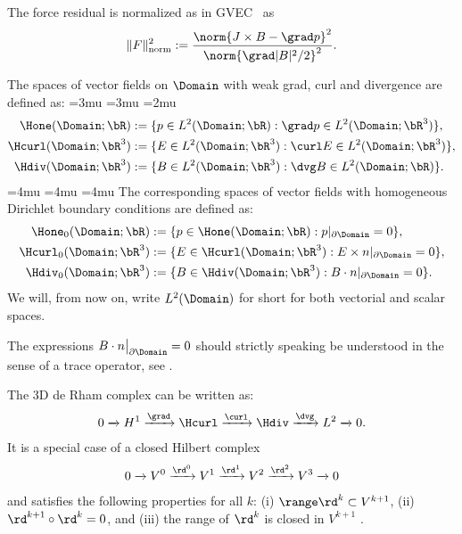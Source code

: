 \documentclass[%
 reprint,
 superscriptaddress,
 amsmath,amssymb,
 aps, nofootinbib, floatfix]{revtex4-2}
\begin{document}
The force residual is normalized as in GVEC~\cite{Hindenlang2026} as
\begin{align}
    \| F \|^2_{\mathrm{norm}} := \frac{\norm{J \times B - \grad p}^2}{\norm{ \grad |B|^2 / 2}^2}.
\end{align}

\begin{definition}
    The spaces of vector fields on $\Domain$ with weak grad, curl and divergence are defined as:
    \medmuskip=3mu
    \thinmuskip=3mu
    \thickmuskip=2mu
    \begin{align}
        \Hone(\Domain; \bR)    &:= \{ p \in L^2(\Domain; \bR): \grad p \in L^2(\Domain; \bR^3) \},  \\
        \Hcurl(\Domain; \bR^3) &:= \{ E \in L^2(\Domain; \bR^3): \curl E \in L^2(\Domain; \bR^3) \}, \\
        \Hdiv(\Domain; \bR^3)  &:= \{ B \in L^2(\Domain; \bR^3): \dvg B \in L^2(\Domain; \bR) \}.
    \end{align}
    \medmuskip=4mu
    \thinmuskip=4mu
    \thickmuskip=4mu
    The corresponding spaces of vector fields with homogeneous Dirichlet boundary conditions are defined as:
    \begin{align}
        \Hone_0(\Domain; \bR)    &:= \{ p \in \Hone(\Domain; \bR): p|_{\partial \Domain} = 0 \},  \\
        \Hcurl_0(\Domain; \bR^3) &:= \{ E \in \Hcurl(\Domain; \bR^3): E \times n|_{\partial \Domain} = 0 \},  \\
        \Hdiv_0(\Domain; \bR^3)  &:= \{ B \in \Hdiv(\Domain; \bR^3): B \cdot n|_{\partial \Domain} = 0 \}.
    \end{align}
    We will, from now on, write $L^2(\Domain)$ for short for both vectorial and scalar spaces.
\end{definition}
\begin{remark}
    The expressions $B \cdot n \big |_{\partial \Domain} = 0$ should strictly speaking be understood in the sense of a trace operator, see \citep[Lemma 2.1.1]{boffi_mixed_2013}.
\end{remark}
%
The 3D de Rham complex can be written as:
\begin{align}
    \label{eq:deRhamComplex}
    0 \xrightarrow[]{} H^1 \xrightarrow[]{\grad} \Hcurl \xrightarrow[]{\curl}\Hdiv \xrightarrow[]{\dvg} L^2 \xrightarrow[]{} 0. 
\end{align}
It is a special case of a closed Hilbert complex
\begin{align}
    \label{eq:deRhamComplex_general}
    0 \xrightarrow[]{} V^0 \xrightarrow[]{\rd^0} V^1 \xrightarrow[]{\rd^1} V^2 \xrightarrow[]{\rd^2} V^3 \xrightarrow[]{} 0
\end{align}
and satisfies the following properties for all $k$: (i) $\range \rd^k \subset V^{k+1}$, (ii) $\rd^{k+1} \circ \rd^{k} = 0$, and (iii) the range of $\rd^k$ is closed in $V^{k+1}$ \citep[Section 3.1.3]{arnold_finite_2010}.
\end{document}
